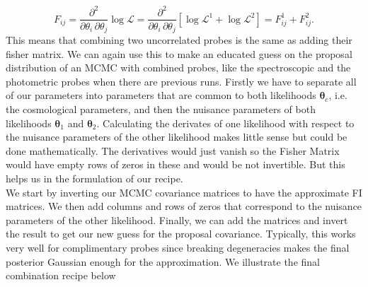 \documentclass[../main.tex]{subfiles}
\begin{document}
\begin{equation}
    F_{ij} = \frac{\partial^2}{\partial \theta_i\,\partial \theta_j} \log \mathcal{L} = \frac{\partial^2}{\partial \theta_i\,\partial \theta_j} \left[\log \mathcal{L}^1 + \log\mathcal{L}^2\right] = F^1_{ij} + F^2_{ij}.
\end{equation}
This means that combining two uncorrelated probes is the same as adding their fisher matrix. We can again use this to make an educated guess on the proposal distribution of an MCMC with combined probes, like the spectroscopic and the photometric probes when there are previous runs. Firstly we have to separate all of our parameters into parameters that are common to both likelihoods $\boldsymbol{\theta}_c$, i.e. the cosmological parameters, and then the nuisance parameters of both likelihoods $\boldsymbol{\theta}_1$ and $\boldsymbol{\theta}_2$. Calculating the derivates of one likelihood with respect to the nuisance parameters of the other likelihood makes little sense but could be done mathematically. The derivatives would just vanish so the Fisher Matrix would have empty rows of zeros in these and would be not invertible. But this helps us in the formulation of our recipe.\\
We start by inverting our MCMC covariance matrices to have the approximate FI matrices. We then add columns and rows of zeros that correspond to the nuisance parameters of the other likelihood. Finally, we can add the matrices and invert the result to get our new guess for the proposal covariance. Typically, this works very well for complimentary probes since breaking degeneracies makes the final posterior Gaussian enough for the approximation. We illustrate the final combination recipe below 
\end{document}
